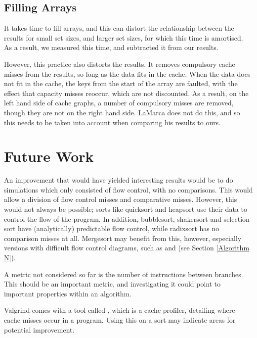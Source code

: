 \subsection{Filling Arrays}

It takes time to fill arrays, and this can distort the relationship between the
results for small set sizes, and larger set sizes, for which this time is
amortised. As a result, we measured this time, and subtracted it from our
results.

However, this practice also distorts the results. It removes compulsory cache
misses from the results, so long as the data fits in the cache. When the data
does not fit in the cache, the keys from the start of the array are faulted,
with the effect that capacity misses reoccur, which are not discounted. As a
result, on the left hand side of cache graphs, a number of compulsory misses are
removed, though they are not on the right hand side. LaMarca does not do this,
and so this needs to be taken into account when comparing his results to ours.


\section{Future Work}
An improvement that would have yielded interesting results would be to do
simulations which only consisted of flow control, with no comparisons. This
would allow a division of flow control misses and comparative misses. However,
this would not always be possible; sorts like quicksort and heapsort use their
data to control the flow of the program. In addition, bubblesort, shakersort and
selection sort have (analytically) predictable flow control, while radixsort has
no comparison misses at all. Mergesort may benefit from this, however,
especially versions with difficult flow control diagrams, such as  and  (see Section \ref{Algorithm N}).

A metric not considered so far is the number of instructions between branches.
This should be an important metric, and investigating it could point to
important properties within an algorithm.

Valgrind comes with a tool called , which is a cache
profiler, detailing where cache misses occur in a program. Using this on a
sort may indicate areas for potential improvement.
